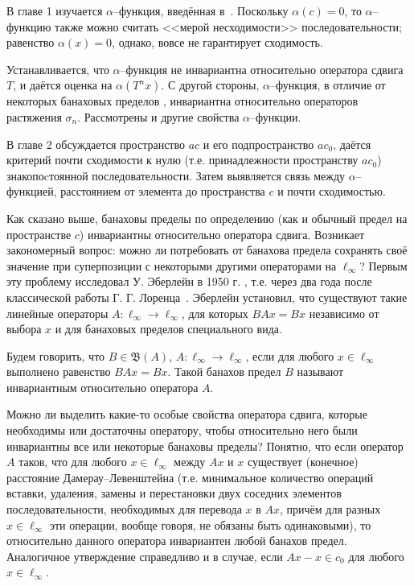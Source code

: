 В главе 1
изучается $\alpha$--функция, введённая в~\cite{our-vzms-2018}.
%
%
Поскольку $\alpha(c)=0$,
то $\alpha$--функцию также можно считать <<мерой несходимости>> последовательности;
равенство $\alpha(x) = 0$, однако, вовсе не гарантирует сходимость.

Устанавливается, что $\alpha$--функция не инвариантна относительно оператора сдвига $T$,
и даётся оценка на $\alpha(T^n x)$.
С другой стороны, $\alpha$--функция, в отличие от некоторых банаховых пределов
\cite{Semenov2010invariant,Semenov2011dan},
инвариантна относительно операторов растяжения $\sigma_n$.
Рассмотрены и другие свойства $\alpha$--функции.

В главе 2 обсуждается пространство $ac$ и его подпространство $ac_0$,
даётся критерий почти сходимости к нулю (т.е. принадлежности пространству $ac_0$)
знакопоcтоянной последовательности.
Затем выявляется связь между $\alpha$--функцией, расстоянием от элемента до пространства $c$
и почти сходимостью.


Как сказано выше, банаховы пределы по определению (как и обычный предел на пространстве $c$) инвариантны относительно оператора сдвига.
Возникает закономерный вопрос: можно ли потребовать от банахова предела сохранять своё значение
при суперпозиции с некоторыми другими операторами на $\ell_\infty$?
Первым эту проблему исследовал У. Эберлейн в 1950 г. \cite{Eberlein},
т.е. через два года после классической работы Г. Г. Лоренца~\cite{lorentz1948contribution}.
Эберлейн установил, что существуют такие линейные операторы  $A : \ell_\infty\to \ell_\infty$,
для которых $BAx = Bx$ независимо от выбора $x$ и для банаховых пределов специального вида.

Будем говорить, что $B\in\mathfrak B(A)$, $A : \ell_\infty\to \ell_\infty$, если для любого $x\in \ell_\infty$
выполнено равенство $BAx = Bx$.
Такой банахов предел $B$ называют инвариантным относительно оператора $A$.

Можно ли выделить какие-то особые свойства оператора сдвига,
которые необходимы или достаточны оператору, чтобы относительно него были инвариантны все или некоторые банаховы пределы?
Понятно, что если оператор $A$ таков, что для любого $x\in\ell_\infty$ между $Ax$ и $x$
существует (конечное) расстояние Дамерау--Левенштейна \cite{damerau1964technique} (т.е. минимальное количество операций вставки, удаления, замены и перестановки двух соседних элементов последовательности, необходимых для перевода $x$ в $Ax$, причём для разных $x\in\ell_\infty$ эти операции, вообще говоря, не обязаны быть одинаковыми), то относительно данного оператора инвариантен любой банахов предел. Аналогичное утверждение справедливо и в случае, если $Ax -x \in c_0$ для любого $x\in \ell_\infty$.

